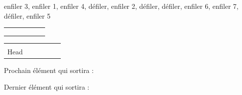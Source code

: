 \documentclass[11pt,a4paper]{article}
\begin{document}
\bigskip

\begin{center}

\begin{large}
enfiler 3, enfiler 1, enfiler 4, défiler, enfiler 2, défiler, défiler, enfiler 6, enfiler 7, défiler, enfiler 5
\end{large}

\bigskip

\begin{tabular}{ | C{1cm} | C{1cm} | C{1cm} | C{1cm} | C{1cm} | C{1cm} | }
  \hline
     &    &    &    &    &    \\
     &    &    &    &    &    \\
     &    &    &    &    &    \\
  \hline
\end{tabular}

\smallskip

\begin{tabular}{   C{1cm}   C{1cm}   C{1cm}   C{1cm}   C{1cm}   C{1cm}   }
   &  &  &  &  &  \\
  Head &  &  &  &  &  \\
\end{tabular}


\begin{table}[ht!]
  \begin{minipage}{0.50\textwidth}

Prochain élément qui sortira :

  \end{minipage}
  \hfillx
  \begin{minipage}{0.50\textwidth}

Dernier élément qui sortira :

  \end{minipage}
\end{table}
\end{center}


\bigskip
\end{document}
